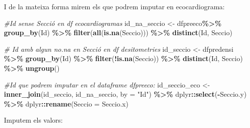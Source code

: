 \documentclass[
]{book}
\newenvironment{Shaded}{\begin{snugshade}}{\end{snugshade}}
\newcommand{\AttributeTok}[1]{\textcolor[rgb]{0.13,0.29,0.53}{#1}}
\newcommand{\CommentTok}[1]{\textcolor[rgb]{0.56,0.35,0.01}{\textit{#1}}}
\newcommand{\FunctionTok}[1]{\textcolor[rgb]{0.13,0.29,0.53}{\textbf{#1}}}
\newcommand{\NormalTok}[1]{#1}
\newcommand{\OtherTok}[1]{\textcolor[rgb]{0.56,0.35,0.01}{#1}}
\newcommand{\SpecialCharTok}[1]{\textcolor[rgb]{0.81,0.36,0.00}{\textbf{#1}}}
\newcommand{\StringTok}[1]{\textcolor[rgb]{0.31,0.60,0.02}{#1}}
\theoremstyle{definition}
\theoremstyle{definition}
\theoremstyle{definition}
\theoremstyle{definition}
\theoremstyle{remark}
\begin{document}
I de la mateixa forma mirem els que podrem imputar en ecocardiograma:

\begin{Shaded}
\begin{Highlighting}[]
\CommentTok{\#Id sense Secció en df ecocardiogramas}
\NormalTok{id\_na\_seccio }\OtherTok{\textless{}{-}}\NormalTok{ dfpreeco}\SpecialCharTok{\%\textgreater{}\%} 
  \FunctionTok{group\_by}\NormalTok{(Id) }\SpecialCharTok{\%\textgreater{}\%}
  \FunctionTok{filter}\NormalTok{(}\FunctionTok{all}\NormalTok{(}\FunctionTok{is.na}\NormalTok{(Seccio))) }\SpecialCharTok{\%\textgreater{}\%} 
  \FunctionTok{distinct}\NormalTok{(Id, Seccio)}

\CommentTok{\# Id amb algun no.na en Secció en df desitometries}
\NormalTok{id\_seccio }\OtherTok{\textless{}{-}}\NormalTok{ dfpredensi }\SpecialCharTok{\%\textgreater{}\%}
  \FunctionTok{group\_by}\NormalTok{(Id) }\SpecialCharTok{\%\textgreater{}\%}
  \FunctionTok{filter}\NormalTok{(}\SpecialCharTok{!}\FunctionTok{is.na}\NormalTok{(Seccio)) }\SpecialCharTok{\%\textgreater{}\%} 
  \FunctionTok{distinct}\NormalTok{(Id, Seccio) }\SpecialCharTok{\%\textgreater{}\%} 
  \FunctionTok{ungroup}\NormalTok{()}

\CommentTok{\#Id que podrem imputar en el dataframe dfpreeco:}
\NormalTok{id\_seccio\_eco }\OtherTok{\textless{}{-}} \FunctionTok{inner\_join}\NormalTok{(id\_seccio, id\_na\_seccio, }\AttributeTok{by =} \StringTok{"Id"}\NormalTok{) }\SpecialCharTok{\%\textgreater{}\%} 
\NormalTok{  dplyr}\SpecialCharTok{::}\FunctionTok{select}\NormalTok{(}\SpecialCharTok{{-}}\NormalTok{Seccio.y) }\SpecialCharTok{\%\textgreater{}\%} 
\NormalTok{  dplyr}\SpecialCharTok{::}\FunctionTok{rename}\NormalTok{(}\AttributeTok{Seccio =}\NormalTok{ Seccio.x)}
\end{Highlighting}
\end{Shaded}

Imputem els valors:
\end{document}
